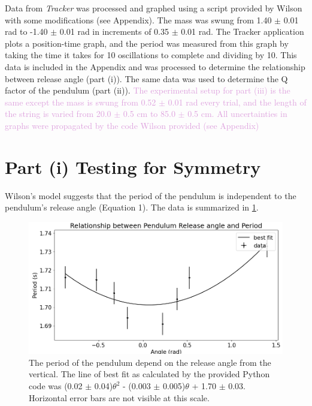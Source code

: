 \documentclass[notitlepage, twocolumn, 12pt]{article}
\begin{document}
    Data from \textit{Tracker} was processed and graphed using a script provided by Wilson with some modifications (see Appendix).
    The mass was swung from 1.40 $\pm$ 0.01 rad to -1.40 $\pm$ 0.01 rad in increments of 0.35 $\pm$ 0.01 rad. The Tracker application plots a position-time graph, and the period was measured from this graph by taking the time it takes for 10 oscillations to complete and dividing by 10. This data is included in the Appendix and was processed to determine the relationship between release angle (part (i)). The same data was used to determine the Q factor of the pendulum (part (ii)).
    \textcolor{Plum}{The experimental setup for part (iii) is the same except the mass is swung from 0.52 $\pm$ 0.01 rad every trial, and the length of the string is varied from 20.0 $\pm$ 0.5 cm to 85.0 $\pm$ 0.5 cm. All uncertainties in graphs were propagated by the code Wilson provided (see Appendix)} %


    \section*{Part (i) Testing for Symmetry}
    Wilson's model suggests that the period of the pendulum is independent to the pendulum's release angle (Equation 1). The data is summarized in \cref{fig:symmetryTest}.

    \begin{figure}[H]
        \includegraphics[width=\linewidth]{pendulum_release_angle_vs_period.png}
        \caption{The period of the pendulum depend on the release angle from the vertical. The line of best fit as calculated by the provided Python code \cite{Wilson} was (0.02 $\pm$ 0.04)$\theta^2$ - (0.003 $\pm$ 0.005)$\theta$ + 1.70 $\pm$ 0.03. Horizontal error bars are not visible at this scale.}
        \label{fig:symmetryTest}
    \end{figure}
\end{document}
